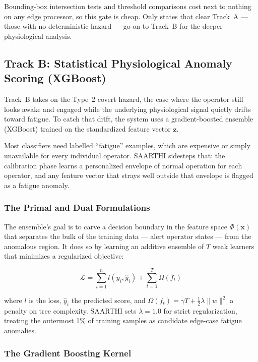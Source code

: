 Bounding-box intersection tests and threshold comparisons cost next to nothing
on any edge processor, so this gate is cheap. Only states that clear Track~A ---
those with no deterministic hazard --- go on to Track~B for the deeper
physiological analysis.

\subsection{Track B: Statistical Physiological Anomaly Scoring (XGBoost)}

Track~B takes on the Type~2 covert hazard, the case where the operator still
looks awake and engaged while the underlying physiological signal quietly drifts
toward fatigue. To catch that drift, the system uses a gradient-boosted ensemble
(XGBoost) trained on the standardized feature vector $\mathbf{z}$.

Most classifiers need labelled ``fatigue'' examples, which are expensive or
simply unavailable for every individual operator. SAARTHI sidesteps that: the
calibration phase learns a personalized envelope of normal operation for each
operator, and any feature vector that strays well outside that envelope is
flagged as a fatigue anomaly.

\subsubsection{The Primal and Dual Formulations}

The ensemble's goal is to carve a decision boundary in the feature space
$\Phi(\mathbf{x})$ that separates the bulk of the training data --- alert
operator states --- from the anomalous region. It does so by learning an
additive ensemble of $T$ weak learners that minimizes a regularized objective:

\begin{equation}
\mathcal{L} = \sum_{i=1}^{n} l(y_i, \hat{y}_i) + \sum_{t=1}^{T} \Omega(f_t)
\end{equation}

where $l$ is the loss, $\hat{y}_i$ the predicted score, and
$\Omega(f_t) = \gamma T + \tfrac{1}{2}\lambda \lVert w \rVert^2$ a penalty on
tree complexity. SAARTHI sets $\lambda = 1.0$ for strict regularization, treating
the outermost 1\% of training samples as candidate edge-case fatigue anomalies.

\subsubsection{The Gradient Boosting Kernel}

